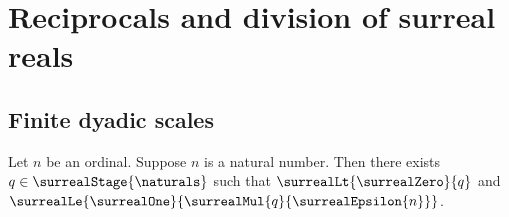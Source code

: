 

\section{Reciprocals and division of surreal reals}

\subsection{Finite dyadic scales}

\begin{lemma}\label{surreal_epsilon_has_finite_weak_inverse}
    Let $n$ be an ordinal.
    Suppose $n$ is a natural number.
    Then there exists $q\in\surrealStage{\naturals}$ such that
        $\surrealLt{\surrealZero}{q}$ and
        $\surrealLe{\surrealOne}
            {\surrealMul{q}{\surrealEpsilon{n}}}$.
\end{lemma}
